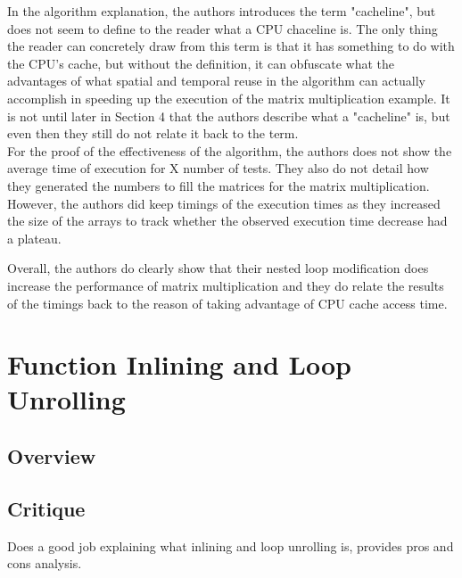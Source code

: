 \documentclass[letterpaper,10pt,titlepage]{article}
\begin{document}
In the algorithm explanation, the authors introduces the term "cacheline", but
does not seem to define to the reader what a CPU chaceline is. The only thing
the reader can concretely draw from this term is that it has something to do
with the CPU's cache, but without the definition, it can obfuscate what the
advantages of what spatial and temporal reuse in the algorithm can actually
accomplish in speeding up the execution of the matrix multiplication example.
It is not until later in Section 4 that the authors describe what a 
"cacheline" is, but even then they still do not relate it back to the term.\\

For the proof of the effectiveness of the algorithm, the authors does not show
the average time of execution for X number of tests. They also do not detail
how they generated the numbers to fill the matrices for the matrix 
multiplication. However, the authors did keep timings of the execution times
as they increased the size of the arrays to track whether the observed 
execution time decrease had a plateau.

Overall, the authors do clearly show that their nested loop modification does
increase the performance of matrix multiplication and they do relate the
results of the timings back to the reason of taking advantage of CPU cache 
access time.

\section*{Function Inlining and Loop Unrolling}
\subsection*{Overview}
\subsection*{Critique}
Does a good job explaining what inlining and loop unrolling is, provides pros
and cons analysis.



\end{document}
